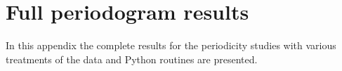 \chapter{Full periodogram results} %
\protect\label{chapter:pgramdetail}

In this appendix the complete results for the periodicity studies with various treatments of the data and Python
routines are presented.
